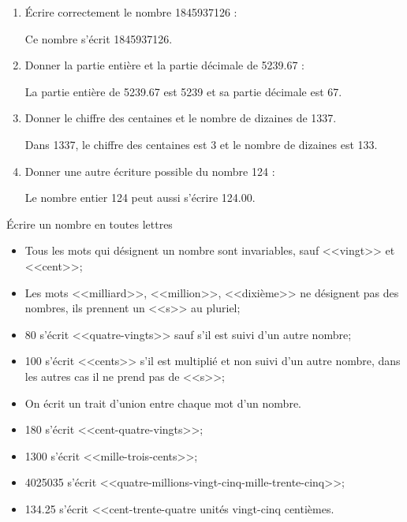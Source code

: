 \begin{myexs}
	\begin{enumerate}
		\item \'Ecrire correctement le nombre 1845937126 :
		
		Ce nombre s'écrit \num{1845937126}.
		\item Donner la partie entière et la partie décimale de  \num{5239.67} :
		
		La partie entière de   \num{5239.67} est \num{5239} et sa partie décimale est 67.	
		
		
		
		\item Donner le chiffre des centaines et le nombre de dizaines de \num{1337}.
		
		Dans \num{1337}, le chiffre des centaines est 3 et le nombre de dizaines est 133.
		
		\item Donner une autre écriture possible du nombre 124 :
		
		Le nombre entier \num{124} peut aussi s'écrire \num{124.00}.

	\end{enumerate}
\end{myexs}


\begin{mymethname}{\'Ecrire un nombre en toutes lettres}
	\begin{itemize}
		\item Tous les mots qui désignent un nombre sont invariables, sauf <<vingt>> et <<cent>>;
		\item Les mots <<milliard>>, <<million>>, <<dixième>> ne désignent pas des nombres, ils prennent un <<s>> au pluriel;
		\item 80 s'écrit <<quatre-vingts>> sauf s'il est suivi d'un autre nombre;
		\item 100 s'écrit <<cents>> s'il est multiplié et non suivi d'un autre nombre, dans les autres cas il ne prend pas de <<s>>;
		\item On écrit un trait d'union entre chaque mot d'un nombre.
	\end{itemize}
\end{mymethname}

\begin{myexs}
	\begin{itemize}
		\item 180 s'écrit \pause <<cent-quatre-vingts>>;\pause
		\item \num{1300} s'écrit \pause <<mille-trois-cents>>;\pause
		\item \num{4025035} s'écrit \pause <<quatre-millions-vingt-cinq-mille-trente-cinq>>;
		\item \num{134.25} s'écrit \pause <<cent-trente-quatre unités vingt-cinq centièmes.
	\end{itemize}
\end{myexs}

